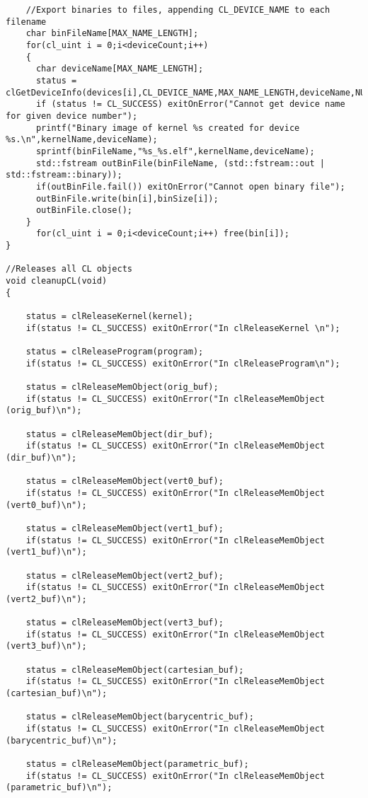 \begin{verbatim}
	//Export binaries to files, appending CL_DEVICE_NAME to each filename
	char binFileName[MAX_NAME_LENGTH];
	for(cl_uint i = 0;i<deviceCount;i++)
	{
	  char deviceName[MAX_NAME_LENGTH];
	  status = clGetDeviceInfo(devices[i],CL_DEVICE_NAME,MAX_NAME_LENGTH,deviceName,NULL);
	  if (status != CL_SUCCESS) exitOnError("Cannot get device name for given device number");
	  printf("Binary image of kernel %s created for device %s.\n",kernelName,deviceName);
	  sprintf(binFileName,"%s_%s.elf",kernelName,deviceName);
	  std::fstream outBinFile(binFileName, (std::fstream::out | std::fstream::binary));
	  if(outBinFile.fail()) exitOnError("Cannot open binary file");
	  outBinFile.write(bin[i],binSize[i]);
	  outBinFile.close();
	}
      for(cl_uint i = 0;i<deviceCount;i++) free(bin[i]);
}

//Releases all CL objects
void cleanupCL(void)
{

	status = clReleaseKernel(kernel);
	if(status != CL_SUCCESS) exitOnError("In clReleaseKernel \n");

	status = clReleaseProgram(program);
	if(status != CL_SUCCESS) exitOnError("In clReleaseProgram\n");

	status = clReleaseMemObject(orig_buf);
	if(status != CL_SUCCESS) exitOnError("In clReleaseMemObject (orig_buf)\n");

	status = clReleaseMemObject(dir_buf);
	if(status != CL_SUCCESS) exitOnError("In clReleaseMemObject (dir_buf)\n");

	status = clReleaseMemObject(vert0_buf);
	if(status != CL_SUCCESS) exitOnError("In clReleaseMemObject (vert0_buf)\n");

	status = clReleaseMemObject(vert1_buf);
	if(status != CL_SUCCESS) exitOnError("In clReleaseMemObject (vert1_buf)\n");

	status = clReleaseMemObject(vert2_buf);
	if(status != CL_SUCCESS) exitOnError("In clReleaseMemObject (vert2_buf)\n");

	status = clReleaseMemObject(vert3_buf);
	if(status != CL_SUCCESS) exitOnError("In clReleaseMemObject (vert3_buf)\n");

	status = clReleaseMemObject(cartesian_buf);
	if(status != CL_SUCCESS) exitOnError("In clReleaseMemObject (cartesian_buf)\n");
	
	status = clReleaseMemObject(barycentric_buf);
	if(status != CL_SUCCESS) exitOnError("In clReleaseMemObject (barycentric_buf)\n");
	
	status = clReleaseMemObject(parametric_buf);
	if(status != CL_SUCCESS) exitOnError("In clReleaseMemObject (parametric_buf)\n");
		

\end{verbatim}

